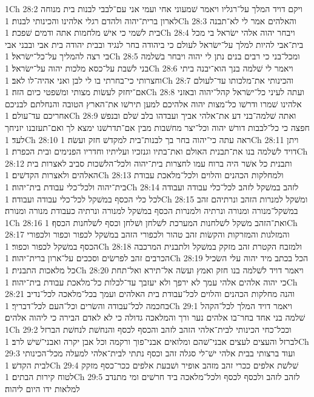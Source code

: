 1Ch 28:2  ויקם דויד המלך על־רגליו ויאמר שׁמעוני אחי ועמי אני עם־לבבי לבנות בית מנוחה לארון ברית־יהוה ולהדם רגלי אלהינו והכינותי לבנות׃
1Ch 28:3  והאלהים אמר לי לא־תבנה בית לשׁמי כי אישׁ מלחמות אתה ודמים שׁפכת׃
1Ch 28:4  ויבחר יהוה אלהי ישׂראל בי מכל בית־אבי להיות למלך על־ישׂראל לעולם כי ביהודה בחר לנגיד ובבית יהודה בית אבי ובבני אבי בי רצה להמליך על־כל־ישׂראל׃
1Ch 28:5  ומכל־בני כי רבים בנים נתן לי יהוה ויבחר בשׁלמה בני לשׁבת על־כסא מלכות יהוה על־ישׂראל׃
1Ch 28:6  ויאמר לי שׁלמה בנך הוא־יבנה ביתי וחצרותי כי־בחרתי בו לי לבן ואני אהיה־לו לאב׃
1Ch 28:7  והכינותי את־מלכותו עד־לעולם אם־יחזק לעשׂות מצותי ומשׁפטי כיום הזה׃
1Ch 28:8  ועתה לעיני כל־ישׂראל קהל־יהוה ובאזני אלהינו שׁמרו ודרשׁו כל־מצות יהוה אלהיכם למען תירשׁו את־הארץ הטובה והנחלתם לבניכם אחריכם עד־עולם׃
1Ch 28:9  ואתה שׁלמה־בני דע את־אלהי אביך ועבדהו בלב שׁלם ובנפשׁ חפצה כי כל־לבבות דורשׁ יהוה וכל־יצר מחשׁבות מבין אם־תדרשׁנו ימצא לך ואם־תעזבנו יזניחך לעד׃
1Ch 28:10  ראה עתה כי־יהוה בחר בך לבנות־בית למקדשׁ חזק ועשׂה׃
1Ch 28:11  ויתן דויד לשׁלמה בנו את־תבנית האולם ואת־בתיו וגנזכיו ועליתיו וחדריו הפנימים ובית הכפרת׃
1Ch 28:12  ותבנית כל אשׁר היה ברוח עמו לחצרות בית־יהוה ולכל־הלשׁכות סביב לאצרות בית האלהים ולאצרות הקדשׁים׃
1Ch 28:13  ולמחלקות הכהנים והלוים ולכל־מלאכת עבודת בית־יהוה ולכל־כלי עבודת בית־יהוה׃
1Ch 28:14  לזהב במשׁקל לזהב לכל־כלי עבודה ועבודה לכל כלי הכסף במשׁקל לכל־כלי עבודה ועבודה׃
1Ch 28:15  ומשׁקל למנרות הזהב ונרתיהם זהב במשׁקל־מנורה ומנורה ונרתיה ולמנרות הכסף במשׁקל למנורה ונרתיה כעבודת מנורה ומנורה׃
1Ch 28:16  ואת־הזהב משׁקל לשׁלחנות המערכת לשׁלחן ושׁלחן וכסף לשׁלחנות הכסף׃
1Ch 28:17  והמזלגות והמזרקות והקשׂות זהב טהור ולכפורי הזהב במשׁקל לכפור וכפור ולכפורי הכסף במשׁקל לכפור וכפור׃
1Ch 28:18  ולמזבח הקטרת זהב מזקק במשׁקל ולתבנית המרכבה הכרבים זהב לפרשׂים וסככים על־ארון ברית־יהוה׃
1Ch 28:19  הכל בכתב מיד יהוה עלי השׂכיל כל מלאכות התבנית׃
1Ch 28:20  ויאמר דויד לשׁלמה בנו חזק ואמץ ועשׂה אל־תירא ואל־תחת כי יהוה אלהים אלהי עמך לא ירפך ולא יעזבך עד־לכלות כל־מלאכת עבודת בית־יהוה׃
1Ch 28:21  והנה מחלקות הכהנים והלוים לכל־עבודת בית האלהים ועמך בכל־מלאכה לכל־נדיב בחכמה לכל־עבודה והשׂרים וכל־העם לכל־דבריך׃
1Ch 29:1  ויאמר דויד המלך לכל־הקהל שׁלמה בני אחד בחר־בו אלהים נער ורך והמלאכה גדולה כי לא לאדם הבירה כי ליהוה אלהים׃
1Ch 29:2  וככל־כחי הכינותי לבית־אלהי הזהב לזהב והכסף לכסף והנחשׁת לנחשׁת הברזל לברזל והעצים לעצים אבני־שׁהם ומלואים אבני־פוך ורקמה וכל אבן יקרה ואבני־שׁישׁ לרב׃
1Ch 29:3  ועוד ברצותי בבית אלהי ישׁ־לי סגלה זהב וכסף נתתי לבית־אלהי למעלה מכל־הכינותי לבית הקדשׁ׃
1Ch 29:4  שׁלשׁת אלפים ככרי זהב מזהב אופיר ושׁבעת אלפים ככר־כסף מזקק לטוח קירות הבתים׃
1Ch 29:5  לזהב לזהב ולכסף לכסף ולכל־מלאכה ביד חרשׁים ומי מתנדב למלאות ידו היום ליהוה׃
